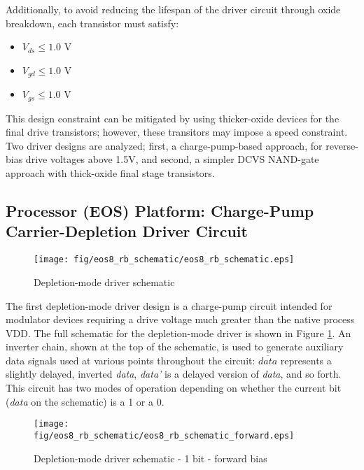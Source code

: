 Additionally, to avoid reducing the lifespan of the driver circuit through oxide breakdown, each transistor must satisfy:


\begin{itemize} 
\item $V_{ds} \le 1.0$ V
\item $V_{gd} \le 1.0$ V
\item $V_{gs} \le 1.0$ V
\end{itemize}

This design constraint can be mitigated by using thicker-oxide devices for the final drive transistors; however, these transitors may impose a speed constraint.  Two driver designs are analyzed; first, a charge-pump-based approach, for reverse-bias drive voltages above 1.5V, and second, a simpler DCVS NAND-gate approach with thick-oxide final stage transistors.

\subsection{Processor (EOS) Platform: Charge-Pump Carrier-Depletion Driver Circuit}

	\begin{figure}[H]
		\begin{center}
			\texttt{[image: fig/eos8\_rb\_schematic/eos8\_rb\_schematic.eps]}
			\caption{\label{fig:eos8_rb_schematic}Depletion-mode driver schematic}
		\end{center}
	\end{figure}

The first depletion-mode driver design is a charge-pump circuit intended for modulator devices requiring a drive voltage much greater than the native process VDD.
The full schematic for the depletion-mode driver is shown in Figure \ref{fig:eos8_rb_schematic}.  An inverter chain, shown at the top of the schematic, is used to generate auxiliary data signals used at various points throughout the circuit: $\overline{data}$ represents a slightly delayed, inverted \emph{data}, \emph{data'} is a delayed version of \emph{data}, and so forth.  This circuit has two modes of operation depending on whether the current bit (\emph{data} on the schematic) is a 1 or a 0.  


	\begin{figure}[H]
		\begin{center}
			\texttt{[image: fig/eos8\_rb\_schematic/eos8\_rb\_schematic\_forward.eps]}
			\caption{\label{fig:eos8_rb_schematic_forward}Depletion-mode driver schematic - 1 bit - forward bias}
		\end{center}
	\end{figure}

